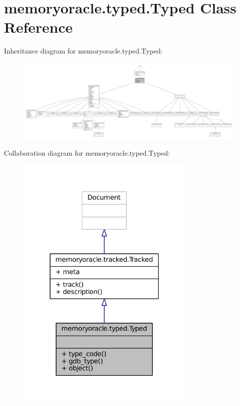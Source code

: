 \hypertarget{classmemoryoracle_1_1typed_1_1Typed}{}\section{memoryoracle.\+typed.\+Typed Class Reference}
\label{classmemoryoracle_1_1typed_1_1Typed}


Inheritance diagram for memoryoracle.\+typed.\+Typed\+:
\nopagebreak
\begin{figure}[H]
\begin{center}
\leavevmode
\includegraphics[width=350pt]{classmemoryoracle_1_1typed_1_1Typed__inherit__graph}
\end{center}
\end{figure}


Collaboration diagram for memoryoracle.\+typed.\+Typed\+:
\nopagebreak
\begin{figure}[H]
\begin{center}
\leavevmode
\includegraphics[width=244pt]{classmemoryoracle_1_1typed_1_1Typed__coll__graph}
\end{center}
\end{figure}
